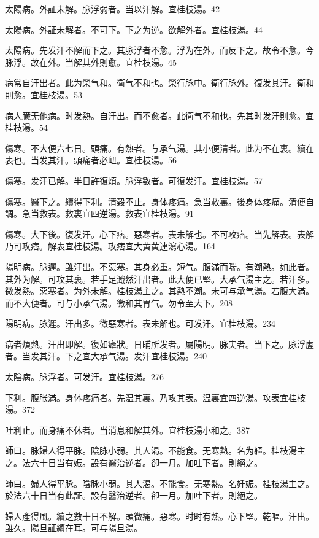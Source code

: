 太陽病。外証未解。脉浮弱者。当以汗解。宜桂枝湯。42

太陽病。外証未解者。不可下。下之为逆。欲解外者。宜桂枝湯。44

太陽病。先发汗不解而下之。其脉浮者不愈。浮为在外。而反下之。故令不愈。今脉浮。故在外。当解其外則愈。宜桂枝湯。45

病常自汗出者。此为榮气和。衛气不和也。榮行脉中。衛行脉外。復发其汗。衛和則愈。宜桂枝湯。53

病人臓无他病。时发熱。自汗出。而不愈者。此衛气不和也。先其时发汗則愈。宜桂枝湯。54

傷寒。不大便六七日。頭痛。有熱者。与承气湯。其小便清者。此为不在裏。續在表也。当发其汗。頭痛者必衄。宜桂枝湯。56

傷寒。发汗已解。半日許復煩。脉浮數者。可復发汗。宜桂枝湯。57

傷寒。醫下之。續得下利。清穀不止。身体疼痛。急当救裏。後身体疼痛。清便自調。急当救表。救裏宜四逆湯。救表宜桂枝湯。91

傷寒。大下後。復发汗。心下痞。惡寒者。表未解也。不可攻痞。当先解表。表解乃可攻痞。解表宜桂枝湯。攻痞宜大黄黄連瀉心湯。164

陽明病。脉遲。雖汗出。不惡寒。其身必重。短气。腹滿而喘。有潮熱。如此者。其外为解。可攻其裏。若手足濈然汗出者。此大便已堅。{\khaaitp 大}承气湯主之。若汗多。微发熱。惡寒者。为外未解。{\khaaitp 桂枝湯主之。}其熱不潮。未可与承气湯。若腹大滿。而不大便者。可与小承气湯。微和其胃气。勿令至大下。208

陽明病。脉遲。汗出多。微惡寒者。表未解也。可发汗。宜桂枝湯。234

病者煩熱。汗出即解。復如瘧狀。日晡所发者。屬陽明。脉実者。当下之。脉浮虗者。当发其汗。下之宜{\khaaitp 大}承气湯。发汗宜桂枝湯。240

太陰病。脉浮者。可发汗。宜桂枝湯。276

下利。腹{\khaaitp 胀}滿。身体疼痛者。先温其裏。乃攻其表。温裏宜四逆湯。攻表宜桂枝湯。372

吐利止。而身痛不休者。当消息和解其外。宜桂枝湯小和之。387

師曰。脉婦人得平脉。陰脉小弱。其人渴。不能食。无寒熱。名为軀。桂枝湯主之。法六十日当有娠。設有醫治逆者。卻一月。加吐下者。則絕之。{\wuben}

師曰。婦人得平脉。陰脉小弱。其人渴。不能食。无寒熱。名妊娠。桂枝湯主之。於法六十日当有此証。設有醫治逆者。卻一月。加吐下者。則絕之。{\dengben}

婦人產得風。續之數十日不解。頭微痛。惡寒。时时有熱。心下堅。乾嘔。汗出。雖久。陽旦証續在耳。可与陽旦湯。{\wuben}

